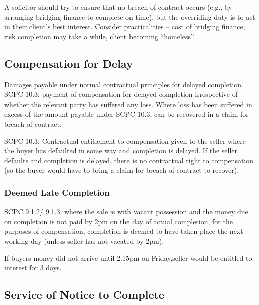 \documentclass[
]{article}
\newenvironment{Shaded}{}{}
\newcommand{\NormalTok}[1]{#1}
\begin{document}
A solicitor should try to ensure that no breach of contract occurs
(e.g., by arranging bridging finance to complete on time), but the
overriding duty is to act in their client's best interest. Consider
practicalities -- cost of bridging finance, risk completion may take a
while, client becoming ``homeless''.

\hypertarget{compensation-for-delay}{%
\subsection{Compensation for Delay}\label{compensation-for-delay}}

Damages payable under normal contractual principles for delayed
completion. SCPC 10.3: payment of compensation for delayed completion
irrespective of whether the relevant party has suffered any loss. Where
loss has been suffered in excess of the amount payable under SCPC 10.3,
can be recovered in a claim for breach of contract.

SCPC 10.3: Contractual entitlement to compensation given to the seller
where the buyer has defaulted in some way and completion is delayed. If
the seller defaults and completion is delayed, there is no contractual
right to compensation (so the buyer would have to bring a claim for
breach of contract to recover).

\hypertarget{deemed-late-completion}{%
\subsubsection{Deemed Late Completion}\label{deemed-late-completion}}

SCPC 9.1.2/ 9.1.3: where the sale is with vacant possession and the
money due on completion is not paid by 2pm on the day of actual
completion, for the purposes of compensation, completion is deemed to
have taken place the next working day (unless seller has not vacated by
2pm).

\begin{Shaded}
\begin{Highlighting}[]
\NormalTok{If buyer\textquotesingle{}s money did not arrive until 2.15pm on Friday,seller would be entitled to interest for 3 days. }
\end{Highlighting}
\end{Shaded}

\hypertarget{service-of-notice-to-complete}{%
\subsection{Service of Notice to
Complete}\label{service-of-notice-to-complete}}
\end{document}
